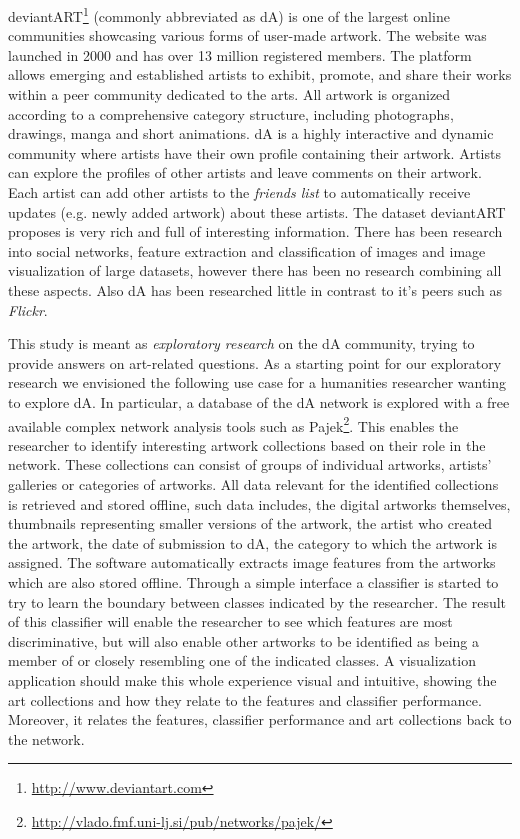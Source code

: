deviantART\footnote{\url{http://www.deviantart.com}} (commonly abbreviated as dA) is one of the largest online communities showcasing various forms of user-made artwork.
The website was launched in 2000 and has over 13 million registered members.
The platform allows emerging and established artists to exhibit, promote, and share their works within a peer community dedicated to the arts. 
All artwork is organized according to a comprehensive category structure, including photographs, drawings, manga and short animations.
dA is a highly interactive and dynamic community where artists have their own profile containing their artwork.
Artists can explore the profiles of other artists and leave comments on their artwork.
Each artist can add other artists to the \textit{friends list} to automatically receive updates (e.g. newly added artwork) about these artists.
The dataset deviantART proposes is very rich and full of interesting information. There has been research into social networks, feature extraction and classification of images and image visualization of large datasets, however there has been no research combining all these aspects. Also dA has been researched little in contrast to it's peers such as \textit{Flickr}.

This study is meant as \textit{exploratory research} on the dA community, trying to provide answers on art-related questions.
As a starting point for our exploratory research we envisioned the following use case for a humanities researcher wanting to explore dA. In particular, a database of the dA network is explored with a free available complex network analysis tools such as Pajek\footnote{\url{http://vlado.fmf.uni-lj.si/pub/networks/pajek/}}. This enables the researcher to identify interesting artwork collections based on their role in the network. These collections can consist of groups of individual artworks, artists' galleries or categories of artworks.  All data relevant for the identified collections is retrieved and stored offline, such data includes, the digital artworks themselves, thumbnails representing smaller versions of the artwork, the artist who created the artwork, the date of submission to dA, the category to which the artwork is assigned. The software automatically extracts image features from the artworks which are also stored offline. Through a simple interface a classifier is started to try to learn the boundary between classes indicated by the researcher. The result of this classifier will enable the researcher to see which features are most discriminative, but will also enable other artworks to be identified as being a member of or closely resembling one of the indicated classes. A visualization application should make this whole experience visual and intuitive, showing the art collections and how they relate to the features and classifier performance. Moreover, it relates the features, classifier performance and art collections back to the network.

